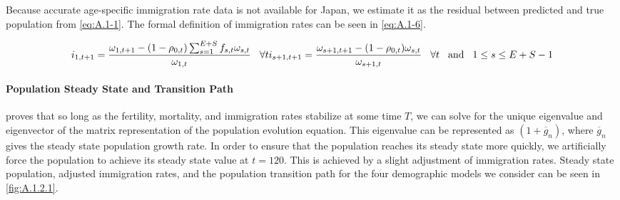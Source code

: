 \documentclass[10pt]{article}
\numberwithin{equation}{subsection}
\begin{document}
\begin{appendices}
\par Because accurate age-specific immigration rate data is not available for Japan, we estimate it as the residual between predicted and true population from \ref{eq:A.1-1}. The formal definition of immigration rates can be seen in \ref{eq:A.1-6}.

\begin{dmath}
   {i_{1,t+1} = \frac{\omega_{1,t+1} - (1-\rho_{0,t})\sum_{s=1}^{E+S}f_{s,t}\omega_{s,t}}{\omega_{1,t}} \hspace{3mm} \forall t} \\
   {i_{s+1,t+1} = \frac{\omega_{s+1,t+1} - (1-\rho_{0,t})\omega_{s,t}}{\omega_{s+1,t}} \hspace{3mm} \forall t \hspace{3mm} \text{and} \hspace{3mm} 1 \leq s \leq E + S - 1}
\end{dmath}


\paragraph{Population Steady State and Transition Path}

\cite{E2020} proves that so long as the fertility, mortality, and immigration rates stabilize at some time \(T\), we can solve for the unique eigenvalue and eigenvector of the matrix representation of the population evolution equation. This eigenvalue can be represented as \((1 + \overline{g}_n)\), where \(\overline{g}_n\) gives the steady state population growth rate. In order to ensure that the population reaches its steady state more quickly, we artificially force the population to achieve its steady state value at \(t=120\). This is achieved by a slight adjustment of immigration rates. Steady state population, adjusted immigration rates, and the population transition path for the four demographic models we consider can be seen in \autoref{fig:A.1.2.1}.


\end{appendices}
\end{document}
